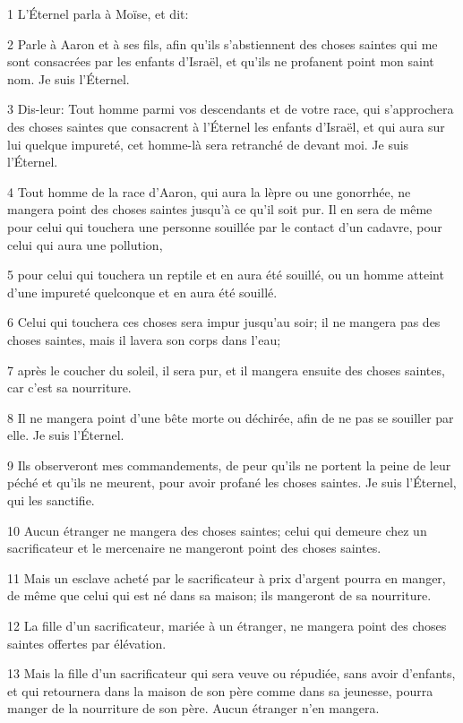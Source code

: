 \par 1 L'Éternel parla à Moïse, et dit:
\par 2 Parle à Aaron et à ses fils, afin qu'ils s'abstiennent des choses saintes qui me sont consacrées par les enfants d'Israël, et qu'ils ne profanent point mon saint nom. Je suis l'Éternel.
\par 3 Dis-leur: Tout homme parmi vos descendants et de votre race, qui s'approchera des choses saintes que consacrent à l'Éternel les enfants d'Israël, et qui aura sur lui quelque impureté, cet homme-là sera retranché de devant moi. Je suis l'Éternel.
\par 4 Tout homme de la race d'Aaron, qui aura la lèpre ou une gonorrhée, ne mangera point des choses saintes jusqu'à ce qu'il soit pur. Il en sera de même pour celui qui touchera une personne souillée par le contact d'un cadavre, pour celui qui aura une pollution,
\par 5 pour celui qui touchera un reptile et en aura été souillé, ou un homme atteint d'une impureté quelconque et en aura été souillé.
\par 6 Celui qui touchera ces choses sera impur jusqu'au soir; il ne mangera pas des choses saintes, mais il lavera son corps dans l'eau;
\par 7 après le coucher du soleil, il sera pur, et il mangera ensuite des choses saintes, car c'est sa nourriture.
\par 8 Il ne mangera point d'une bête morte ou déchirée, afin de ne pas se souiller par elle. Je suis l'Éternel.
\par 9 Ils observeront mes commandements, de peur qu'ils ne portent la peine de leur péché et qu'ils ne meurent, pour avoir profané les choses saintes. Je suis l'Éternel, qui les sanctifie.
\par 10 Aucun étranger ne mangera des choses saintes; celui qui demeure chez un sacrificateur et le mercenaire ne mangeront point des choses saintes.
\par 11 Mais un esclave acheté par le sacrificateur à prix d'argent pourra en manger, de même que celui qui est né dans sa maison; ils mangeront de sa nourriture.
\par 12 La fille d'un sacrificateur, mariée à un étranger, ne mangera point des choses saintes offertes par élévation.
\par 13 Mais la fille d'un sacrificateur qui sera veuve ou répudiée, sans avoir d'enfants, et qui retournera dans la maison de son père comme dans sa jeunesse, pourra manger de la nourriture de son père. Aucun étranger n'en mangera.
